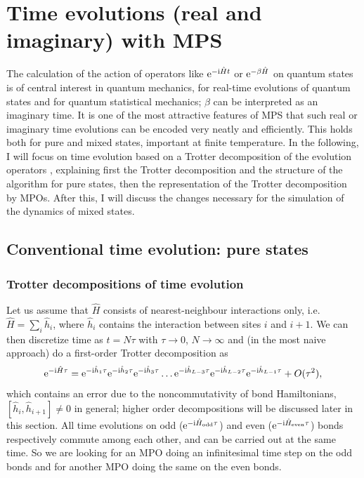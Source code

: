 \documentclass[a4paper,10pt,oneside,onecolumn,1p,times]{elsarticle}
\newcommand{\eul}{{\rm e }}
\newcommand{\imag}{{\rm i }}
\begin{document}
\section{Time evolutions (real and imaginary) with MPS}
The calculation of the action of operators like $\eul^{-\imag \hat{H}t}$ or $\eul^{-\beta\hat{H}}$ on quantum states is of central interest in quantum mechanics, for real-time evolutions of quantum states and for quantum statistical mechanics; $\beta$ can be interpreted as an imaginary time. It is one of the most attractive features of MPS that such real or imaginary time evolutions can be encoded very neatly and efficiently. This holds both for pure and mixed states, important at finite temperature. In the following, I will focus on time evolution based on a Trotter decomposition of the evolution operators \cite{Vidal03a,Vidal04b,Daley04,WhiteFeiguin04,VerstraeteRipoll04}, explaining first the Trotter decomposition and the structure of the algorithm for pure states, then the representation of the Trotter decomposition by MPOs. After this, I will discuss the changes necessary for the simulation of the dynamics of mixed states.
\subsection{Conventional time evolution: pure states}

\subsubsection{Trotter decompositions of time evolution}
Let us assume that $\hat{H}$ consists of nearest-neighbour interactions only, i.e.\ $\hat{H} = \sum_i \hat{h}_i$, where $\hat{h}_i$ contains the interaction between sites $i$ and $i+1$. We can then discretize time as $t = N \tau$ with $\tau\rightarrow 0$, $N \rightarrow \infty$ and (in the most naive approach) do a first-order Trotter decomposition as
\begin{equation}
\eul^{-\imag \hat{H}\tau} = \eul^{-\imag  \hat{h}_1 \tau}\eul^{-\imag  \hat{h}_2 \tau}\eul^{-\imag  \hat{h}_3 \tau} \ldots  \eul^{-\imag  \hat{h}_{L-3} \tau}\eul^{-\imag  \hat{h}_{L-2} \tau}\eul^{-\imag  \hat{h}_{L-1} \tau} + O(\tau^2),
\end{equation}
which contains an error due to the noncommutativity of bond Hamiltonians, $[ \hat{h}_i,\hat{h}_{i+1}] \neq 0$ in general; higher order decompositions will be discussed later in this section. All time evolutions on odd ($\eul^{-\imag \hat{H}_{{\rm odd}} \tau}$) and even ($\eul^{-\imag \hat{H}_{{\rm even}} \tau}$) bonds respectively commute among each other, and can be carried out at the same time. So we are looking for an MPO doing an infinitesimal time step on the odd bonds and for another MPO doing the same on the even bonds.
\end{document}
